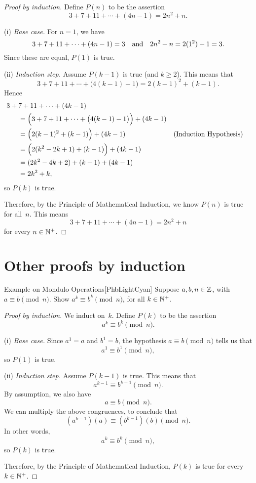 \documentclass[../MATH-2000-Notes.tex]{subfiles}
\begin{document}
\begin{proof}[Proof by induction]
    Define $P(n)$ to be the assertion
    $$ 3 + 7 + 11 + \cdots + (4n-1) = 2n^2 + n .$$

    (i) \emph{Base case.} For $n = 1$, we have
    $$3 + 7 + 11 + \cdots + (4n-1) = 3 \mbox{\quad and\quad}  2n^2 + n = 2(1^2) + 1 = 3.$$
    Since these are equal,
    $P(1)$ is true.

    \medbreak
    (ii) \emph{Induction step.} Assume $P(k-1)$ is true (and $k \ge 2$). This means that
    $$ 3 + 7 + 11 + \cdots + \bigl(4(k-1)-1 \bigr) = 2(k-1)^2 + (k-1) .$$
    Hence
    \begin{align*}
        3 +  {} & 7 + 11 + \cdots + (4k-1)
        \\&= \Bigl( 3 +  7 + 11 + \cdots + \bigl(4(k-1)-1\bigr) \Bigr) + (4k-1)
        \\&= \Bigl( 2(k-1)^2 + (k-1) \Bigr)  + (4k-1) && \text{(Induction Hypothesis)}
        \\&= \Bigl( 2(k^2 - 2k + 1) + (k-1) \Bigr)  + (4k-1)
        \\&= (2k^2 - 4k + 2) + (k-1)  + (4k-1)
        \\&= 2k^2 + k
        ,\end{align*}
    so $P(k)$ is true.

    \medbreak

    Therefore, by the Principle of Mathematical Induction, we know $P(n)$ is true for all~$n$. This means
    $$ 3 + 7 + 11 + \cdots + (4n-1) = 2n^2 + n $$
    for every $n \in \mathbb{N}^+$.
\end{proof}

\section{Other proofs by induction}
\begin{commentbox}{Example on Mondulo Operations}[{PhbLightCyan}]
    Suppose $a,b,n \in \mathbb{Z}$, with $a \equiv b \pmod{n}$. Show
    $a^k \equiv b^k \pmod{n}$, for all $k \in \mathbb{N}^+$.
\end{commentbox}

\begin{proof}[Proof by induction]
    We induct on~$k$. Define $P(k)$ to be the assertion
    $$ a^k \equiv b^k \pmod{n}.$$

    (i) \emph{Base case.} Since $a^1 = a$ and $b^1 = b$, the hypothesis $a \equiv b \pmod{n}$ tells us that
    $$ a^1 \equiv b^1 \pmod{n} ,$$
    so $P(1)$ is true.

    (ii) \emph{Induction step.} Assume $P(k-1)$ is true.
    This means that
    $$a^{k-1} \equiv b^{k-1} \pmod{n} .$$
    By assumption, we also have
    $$ a \equiv b \pmod{n} .$$
    We can multiply the above congruences, to conclude that
    $$ (a^{k-1} )(a) \equiv ( b^{k-1}) (b) \pmod{n} .$$
    In other words,
    $$ a^k \equiv b^k \pmod{n} ,$$
    so $P(k)$ is true.

    \medskip
    Therefore, by the Principle of Mathematical Induction, $P(k)$ is true for every $k \in \mathbb{N}^+$.
\end{proof}
\end{document}
